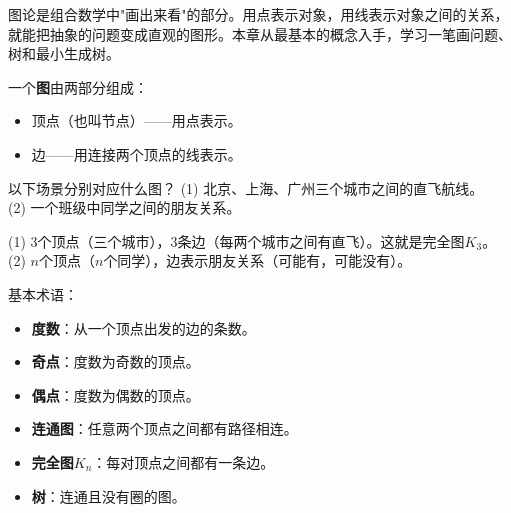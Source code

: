 
图论是组合数学中"画出来看"的部分。用点表示对象，用线表示对象之间的关系，就能把抽象的问题变成直观的图形。本章从最基本的概念入手，学习一笔画问题、树和最小生成树。


一个\textbf{图}由两部分组成：
\begin{itemize}
\item 顶点（也叫节点）——用点表示。
\item 边——用连接两个顶点的线表示。
\end{itemize}

\begin{example}
以下场景分别对应什么图？
(1) 北京、上海、广州三个城市之间的直飞航线。\\
(2) 一个班级中同学之间的朋友关系。
\end{example}
\begin{solution}
(1) $3$个顶点（三个城市），$3$条边（每两个城市之间有直飞）。这就是完全图$K_3$。\\
(2) $n$个顶点（$n$个同学），边表示朋友关系（可能有，可能没有）。
\end{solution}

基本术语：
\begin{itemize}
\item \textbf{度数}：从一个顶点出发的边的条数。
\item \textbf{奇点}：度数为奇数的顶点。
\item \textbf{偶点}：度数为偶数的顶点。
\item \textbf{连通图}：任意两个顶点之间都有路径相连。
\item \textbf{完全图}$K_n$：每对顶点之间都有一条边。
\item \textbf{树}：连通且没有圈的图。
\end{itemize}

